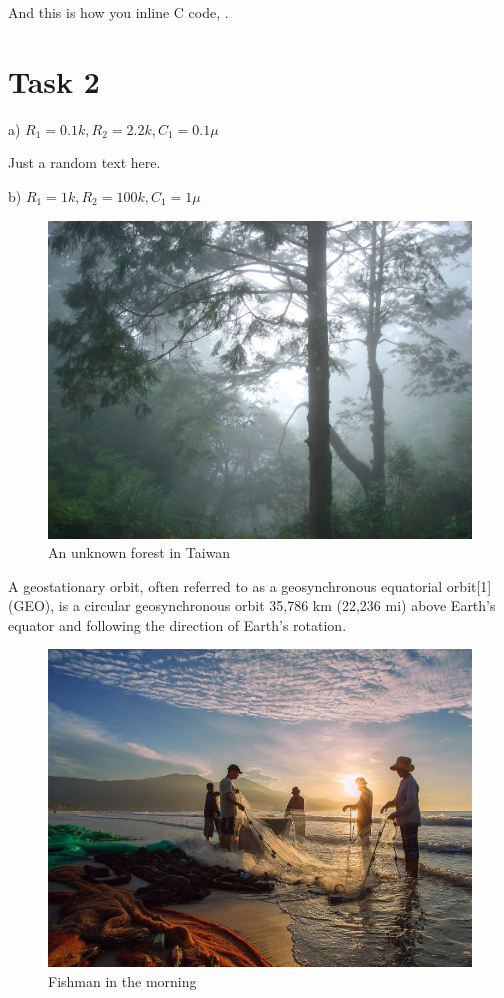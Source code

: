 \documentclass{mytemplate}
\begin{document}
And this is how you inline C code, .

\newpage
\section{Task 2}
a) $R_1=0.1k, R_2=2.2k, C_1=0.1\mu$

Just a random text here.

b) $R_1=1k, R_2=100k, C_1=1\mu$

\begin{figure}[!htb]
  \includegraphics[width=\linewidth]{graph2.jpg}
  \caption{An unknown forest in Taiwan}\label{forest_taiwan}
\endminipage\hfill
\end{figure}

A geostationary orbit, often referred to as a geosynchronous equatorial orbit[1] (GEO), is a circular geosynchronous orbit 35,786 km (22,236 mi) above Earth's equator and following the direction of Earth's rotation.

\begin{figure}[!htb]
  \includegraphics[width=\linewidth]{graph3.jpg}
  \caption{Fishman in the morning}\label{fishman_taiwan}
\endminipage\hfill
\end{figure}
\end{document}
